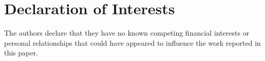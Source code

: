 \section{Declaration of Interests}
The authors declare that they have no known competing financial interests or personal relationships that could have appeared to influence the work reported in this paper.